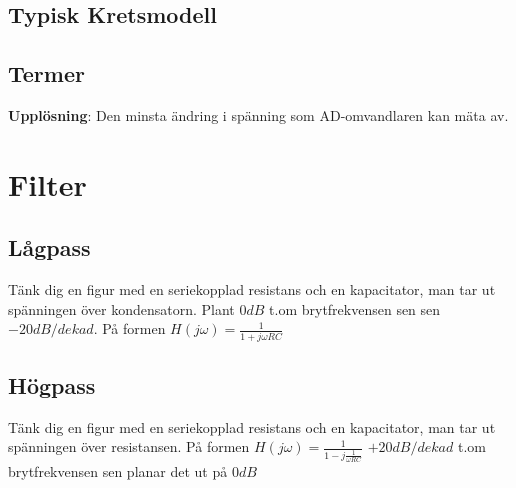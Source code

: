 \documentclass[11pt]{article}
\begin{document}
\subsection{Typisk Kretsmodell}

\subsection{Termer}
\textbf{Upplösning}: Den minsta ändring i spänning som AD-omvandlaren kan mäta av.


\section{Filter}
\subsection{Lågpass}
Tänk dig en figur med en seriekopplad resistans och en kapacitator, man tar ut spänningen över kondensatorn.
Plant $0 dB$ t.om brytfrekvensen sen sen $-20dB/dekad$.
På formen $H(j\omega) = \frac{1}{1+j\omega RC}$

\subsection{Högpass}
Tänk dig en figur med en seriekopplad resistans och en kapacitator, man tar ut spänningen över resistansen.
På formen $H(j\omega) = \frac{1}{1-j\frac{1}{\omega RC}}$
$+20dB/dekad$ t.om brytfrekvensen sen planar det ut på $0 dB$
\end{document}

